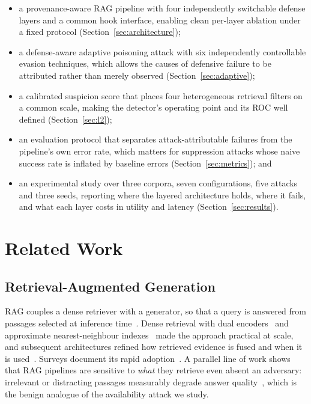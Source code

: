 \documentclass[information,article,submit,moreauthors]{Definitions/mdpi}
\begin{document}
\begin{itemize}
    \item a provenance-aware RAG pipeline with four independently switchable defense layers and
          a common hook interface, enabling clean per-layer ablation under a fixed protocol
          (Section~\ref{sec:architecture});
    \item a defense-aware adaptive poisoning attack with six independently controllable evasion
          techniques, which allows the causes of defensive failure to be attributed rather than
          merely observed (Section~\ref{sec:adaptive});
    \item a calibrated suspicion score that places four heterogeneous retrieval filters on a
          common scale, making the detector's operating point and its ROC well defined
          (Section~\ref{sec:l2});
    \item an evaluation protocol that separates attack-attributable failures from the
          pipeline's own error rate, which matters for suppression attacks whose naive success
          rate is inflated by baseline errors (Section~\ref{sec:metrics}); and
    \item an experimental study over three corpora, seven configurations, five attacks and
          three seeds, reporting where the layered architecture holds, where it fails, and what
          each layer costs in utility and latency (Section~\ref{sec:results}).
\end{itemize}

\section{Related Work}
\label{sec:related}

\subsection{Retrieval-Augmented Generation}

RAG couples a dense retriever with a generator, so that a query is answered from passages
selected at inference time~\citep{lewis2020,guu2020}. Dense retrieval with dual
encoders~\citep{karpukhin2020dpr,reimers2019sbert} and approximate nearest-neighbour
indexes~\citep{johnson2021faiss} made the approach practical at scale, and subsequent
architectures refined how retrieved evidence is fused and when it is
used~\citep{izacard2021fid,borgeaud2022retro,shi2023replug,asai2023selfrag}. Surveys
document its rapid adoption~\citep{gao2024survey}. A parallel line of work shows that RAG
pipelines are sensitive to \emph{what} they retrieve even absent an adversary: irrelevant or
distracting passages measurably degrade answer quality~\citep{yoran2024robust,cuconasu2024noise},
which is the benign analogue of the availability attack we study.
\end{document}
